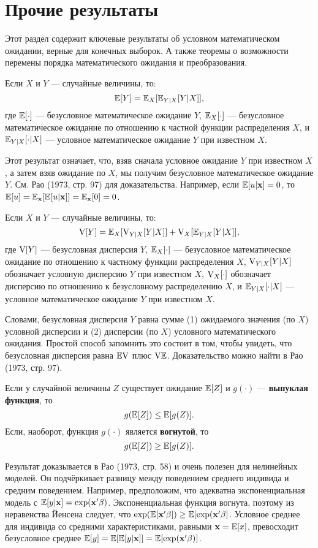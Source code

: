 \section{Прочие результаты}

Этот раздел содержит ключевые результаты об условном математическом ожидании, верные для конечных выборок. А также теоремы о возможности перемены порядка математического ожидания и преобразования.

\begin{theorem}
Если  $X$ и $Y$ --- случайные величины, то:
\[
\mathbb{E}[Y]=\mathbb{E}_X[\mathbb{E}_{Y|X}[Y|X]],
\]
где $\mathbb{E}[\cdot]$ --- безусловное математическое ожидание $Y$, $\mathbb{E}_X[\cdot]$ --- безусловное математическое ожидание по отношению к частной функции распределения $X$, и $\mathbb{E}_{Y|X}[\cdot|X]$ --- условное математическое ожидание $Y$ при известном $X$.	
 \end{theorem} 

Этот результат означает, что, взяв сначала условное ожидание $Y$ при известном $X$, а затем взяв ожидание по $X$, мы получим безусловное математическое ожидание $Y$. См. Рао (1973, стр. 97) для доказательства. Например, если $\mathbb{E}[u|\mathbf{x}]=0$, то $\mathbb{E}[u]=\mathbb{E}_{\mathbf{x}}[\mathbb{E}[u|\mathbf{x}]]=\mathbb{E}_{\mathbf{x}}[0]=0$.

\begin{theorem}
Если  $X$ и $Y$ --- случайные величины, то:
\[
\mathrm{V}[Y]=\mathbb{E}_X[\mathrm{V}_{Y|X}[Y|X]]+\mathrm{V}_X[\mathbb{E}_{Y|X}[Y|X]],
\]
где $\mathrm{V}[Y]$ --- безусловная дисперсия $Y$, $\mathbb{E}_X[\cdot]$ --- безусловное математическое ожидание по отношению к частному функции распределения $X$, $\mathrm{V}_{Y|X}[Y|X]$ обозначает условную дисперсию $Y$ при известном $X$, $\mathrm{V}_X[\cdot]$ обозначает дисперсию по отношению к безусловному распределению $X$, и $\mathbb{E}_{Y|X}[\cdot|X]$ --- условное математическое ожидание $Y$ при известном $X$.	
\end{theorem}

Словами, безусловная дисперсия $Y$ равна сумме (1) ожидаемого значения (по $X$) условной дисперсии и (2) дисперсии (по $X$) условного математического ожидания. Простой способ запомнить это состоит в том, чтобы увидеть, что безусловная дисперсия равна $\mathbb{E}\mathrm{V}$ плюс $\mathrm{V}\mathbb{E}$. Доказательство можно найти в Рао (1973, стр. 97).

\begin{theorem}
Если у случайной величины $Z$ существует ожидание $\mathbb{E}[Z]$ и $g(\cdot)$ --- \textbf{выпуклая функция}, то
\[
g(\mathbb{E}[Z]) \leq \mathbb{E}[g(Z)].
\]
Если, наоборот, функция $g(\cdot)$ является \textbf{вогнутой}, то
\[
g(\mathbb{E}[Z]) \geq \mathbb{E}[g(Z)].
\]
\end{theorem}
Результат доказывается в Рао (1973, стр. 58) и очень полезен для нелинейных моделей. Он подчёркивает разницу между поведением среднего индивида и средним поведением. Например, предположим, что адекватна экспоненциальная модель с $\mathbb{E}[y|\mathbf{x}]=\exp(\mathbf{x}'\mathbf{\beta})$. Экспоненциальная функция вогнута, поэтому из неравенства Йенсена следует, что $\exp(\mathbb{E}[\mathbf{x}'\mathbf{\beta}])\geq \mathbb{E}[\exp(\mathbf{x}'\mathbf{\beta}]$. Условное среднее для индивида со средними характеристиками, равными $\mathbf{x}=\mathbb{E}[x]$, превосходит безусловное среднее $\mathbb{E}[y]=\mathbb{E}[\mathbb{E}[y|\mathbf{x}]]=\mathbb{E}[\exp(\mathbf{x}'\mathbf{\beta})]$.

